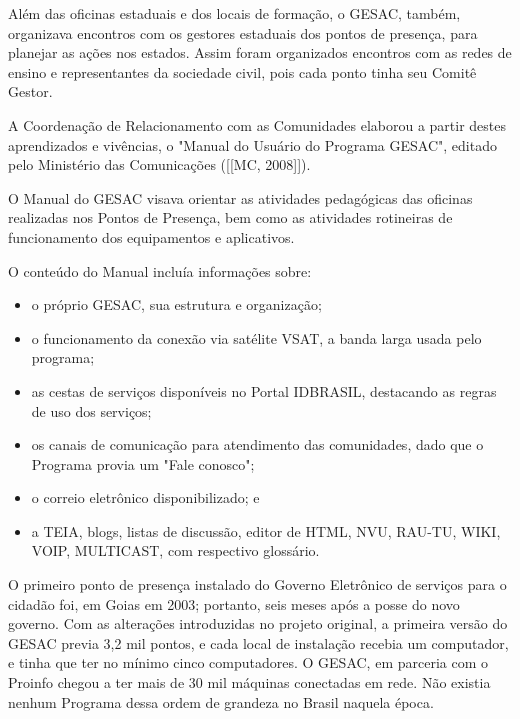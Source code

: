 Além das oficinas estaduais e dos locais de formação, o GESAC, também, organizava encontros com os gestores estaduais dos pontos de presença, para planejar as ações nos estados. Assim foram organizados encontros com as redes de ensino e  representantes da sociedade civil, pois cada ponto  tinha seu Comitê Gestor.

A Coordenação de Relacionamento com as Comunidades elaborou a partir destes aprendizados e vivências, o "Manual do Usuário do Programa GESAC", editado pelo Ministério das Comunicações ([[MC, 2008]]).

O Manual do GESAC visava  orientar as atividades pedagógicas das oficinas realizadas nos Pontos de Presença, bem como as  atividades rotineiras de funcionamento dos equipamentos e aplicativos.

O conteúdo do Manual incluía informações sobre:


\begin{itemize}
\item o próprio GESAC, sua estrutura e organização;
\item o funcionamento da conexão via satélite VSAT, a banda larga usada pelo programa;
\item as cestas de serviços disponíveis no Portal IDBRASIL, destacando as regras de uso dos serviços;
\item os canais de comunicação para atendimento das comunidades, dado que o Programa provia um "Fale conosco";
\item  o correio eletrônico disponibilizado; e
\item a TEIA, blogs, listas de discussão, editor de HTML, NVU, RAU-TU, WIKI, VOIP, MULTICAST, com respectivo glossário.
\end{itemize}


\noindent\begin{center}\mbox{\centering{}}\end{center}


O primeiro ponto de presença instalado do Governo Eletrônico de serviços para o cidadão foi, em Goias em 2003; portanto, seis meses após a posse do novo governo. Com as alterações introduzidas no projeto original, a primeira versão do GESAC previa 3,2 mil pontos, e cada local de instalação recebia um computador, e tinha que ter no mínimo cinco computadores. O GESAC, em parceria com o Proinfo chegou a ter mais de 30 mil máquinas conectadas em rede. Não existia nenhum Programa dessa ordem de grandeza no Brasil naquela época.

